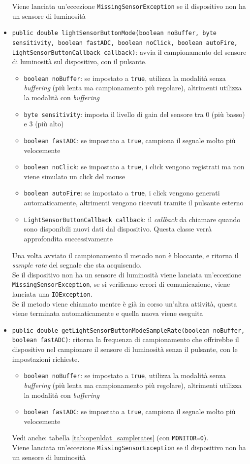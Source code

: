 \begin{itemize}
	Viene lanciata un'eccezione \texttt{MissingSensorException} se il dispositivo non ha un sensore di luminosità
	\item \texttt{public double lightSensorButtonMode(boolean noBuffer, byte sensitivity, boolean fastADC, boolean noClick, boolean autoFire, LightSensorButtonCallback callback)}: avvia il campionamento del sensore di luminosità sul dispositivo, con il pulsante.\begin{itemize}
		\item \texttt{boolean noBuffer}: se impostato a \texttt{true}, utilizza la modalità senza \textit{buffering} (più lenta ma campionamento più regolare), altrimenti utilizza la modalità con \textit{buffering}
		\item \texttt{byte sensitivity}: imposta il livello di gain del sensore tra 0 (più basso) e 3 (più alto)
		\item \texttt{boolean fastADC}: se impostato a \texttt{true}, campiona il segnale molto più velocemente
		\item \texttt{boolean noClick}: se impostato a \texttt{true}, i click vengono registrati ma non viene simulato un click del mouse
		\item \texttt{boolean autoFire}: se impostato a \texttt{true}, i click vengono generati automaticamente, altrimenti vengono ricevuti tramite il pulsante esterno
		\item \texttt{LightSensorButtonCallback callback}: il \textit{callback} da chiamare quando sono disponibili nuovi dati dal dispositivo. Questa classe verrà approfondita successivamente
	\end{itemize}
	Una volta avviato il campionamento il metodo non è bloccante, e ritorna il \textit{sample rate} del segnale che sta acquisendo.\\
	Se il dispositivo non ha un sensore di luminosità viene lanciata un'eccezione \texttt{MissingSensorException}, se si verificano errori di comunicazione, viene lanciata una \texttt{IOException}.\\
	Se il metodo viene chiamato mentre è già in corso un'altra attività, questa viene terminata automaticamente e quella nuova viene eseguita
	\item \texttt{public double getLightSensorButtonModeSampleRate(boolean noBuffer, boolean fastADC)}: ritorna la frequenza di campionamento che offrirebbe il dispositivo nel campionare il sensore di luminosità senza il pulsante, con le impostazioni richieste.\begin{itemize}
		\item \texttt{boolean noBuffer}: se impostato a \texttt{true}, utilizza la modalità senza \textit{buffering} (più lenta ma campionamento più regolare), altrimenti utilizza la modalità con \textit{buffering}
		\item \texttt{boolean fastADC}: se impostato a \texttt{true}, campiona il segnale molto più velocemente
	\end{itemize}
	Vedi anche: tabella \ref{tab:openldat_samplerates} (con \texttt{MONITOR=0}).\\
	Viene lanciata un'eccezione \texttt{MissingSensorException} se il dispositivo non ha un sensore di luminosità
\end{itemize}

